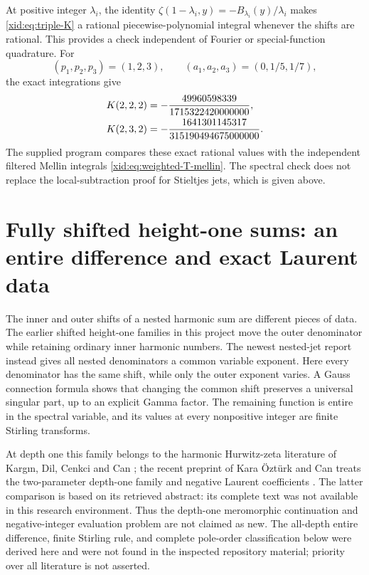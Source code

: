 \documentclass[11pt,a4paper]{article}
\numberwithin{equation}{section}
\theoremstyle{definition}
\theoremstyle{remark}
\begin{document}
At positive integer $\lambda_i$, the identity
$\zeta(1-\lambda_i,y)=-B_{\lambda_i}(y)/\lambda_i$ makes
\eqref{xid:eq:triple-K} a rational piecewise-polynomial integral whenever
the shifts are rational.  This provides a check independent of Fourier
or special-function quadrature.  For
\[
 (p_1,p_2,p_3)=(1,2,3),\qquad
 (a_1,a_2,a_3)=(0,1/5,1/7),
\]
the exact integrations give
\begin{align}
 K(2,2,2)&=-\frac{49960598339}{1715322420000000},\notag\\
 K(2,3,2)&=-\frac{1641301145317}{315190494675000000}.
 \label{xid:eq:triple-rational-checks}
\end{align}
The supplied program compares these exact rational values with the
independent filtered Mellin integrals \eqref{xid:eq:weighted-T-mellin}.
The spectral check does not replace the local-subtraction proof for
Stieltjes jets, which is given above.



\section{Fully shifted height-one sums: an entire difference and exact Laurent data}
\label{xid:hsh:sec:main}

The inner and outer shifts of a nested harmonic sum are different pieces
of data. The earlier shifted height-one families in this project move the
outer denominator while retaining ordinary inner harmonic numbers. The
newest nested-jet report instead gives all nested denominators a common
variable exponent. Here every denominator has the same shift, while only
the outer exponent varies. A Gauss connection formula shows that changing
the common shift preserves a universal singular part, up to an explicit
Gamma factor. The remaining function is entire in the spectral variable,
and its values at every nonpositive integer are finite Stirling transforms.

At depth one this family belongs to the harmonic Hurwitz-zeta literature
of Karg\i n, Dil, Cenkci and Can \cite{hsh:Kargin2023}; the recent preprint
of Kara \"Ozt\"urk and Can treats the two-parameter depth-one family and
negative Laurent coefficients \cite{hsh:KaraCan2026}. The latter comparison
is based on its retrieved abstract: its complete text was not available
in this research environment. Thus the depth-one meromorphic continuation
and negative-integer evaluation problem are not claimed as new. The
all-depth entire difference, finite Stirling rule, and complete pole-order
classification below were derived here and were not found in the
inspected repository material; priority over all literature is not asserted.
\end{document}
